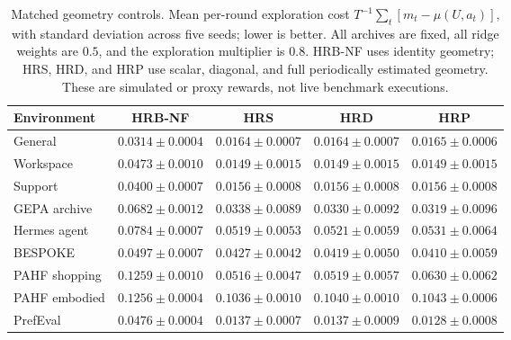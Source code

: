 \begin{table}[!htbp]
\centering
\small
\setlength{\tabcolsep}{4pt}
\caption{Matched geometry controls. Mean per-round exploration cost $T^{-1}\sum_t[m_t-\mu(U,a_t)]$, with standard deviation across five seeds; lower is better. All archives are fixed, all ridge weights are $0.5$, and the exploration multiplier is $0.8$. HRB-NF uses identity geometry; HRS, HRD, and HRP use scalar, diagonal, and full periodically estimated geometry. These are simulated or proxy rewards, not live benchmark executions.}
\label{tab:geometry-controls}
\begin{tabular}{lcccc}
\toprule
Environment & HRB-NF & HRS & HRD & HRP \\
\midrule
General & $0.0314\pm0.0004$ & $0.0164\pm0.0007$ & $0.0164\pm0.0007$ & $0.0165\pm0.0006$ \\
Workspace & $0.0473\pm0.0010$ & $0.0149\pm0.0015$ & $0.0149\pm0.0015$ & $0.0149\pm0.0015$ \\
Support & $0.0400\pm0.0007$ & $0.0156\pm0.0008$ & $0.0156\pm0.0008$ & $0.0156\pm0.0008$ \\
GEPA archive & $0.0682\pm0.0012$ & $0.0338\pm0.0089$ & $0.0330\pm0.0092$ & $0.0319\pm0.0096$ \\
Hermes agent & $0.0784\pm0.0007$ & $0.0519\pm0.0053$ & $0.0521\pm0.0059$ & $0.0531\pm0.0064$ \\
BESPOKE & $0.0497\pm0.0007$ & $0.0427\pm0.0042$ & $0.0419\pm0.0050$ & $0.0410\pm0.0059$ \\
PAHF shopping & $0.1259\pm0.0010$ & $0.0516\pm0.0047$ & $0.0519\pm0.0057$ & $0.0630\pm0.0062$ \\
PAHF embodied & $0.1256\pm0.0004$ & $0.1036\pm0.0010$ & $0.1040\pm0.0010$ & $0.1043\pm0.0006$ \\
PrefEval & $0.0476\pm0.0004$ & $0.0137\pm0.0007$ & $0.0137\pm0.0009$ & $0.0128\pm0.0008$ \\
\bottomrule
\end{tabular}
\end{table}
